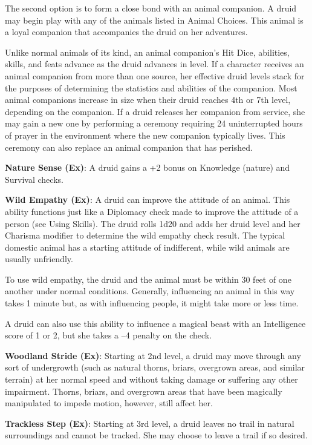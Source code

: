 The second option is to form a close bond with an animal companion. A druid may begin play with any of the animals listed in Animal Choices. This animal is a loyal companion that accompanies the druid on her adventures.
				
Unlike normal animals of its kind, an animal companion's Hit Dice, abilities, skills, and feats advance as the druid advances in level. If a character receives an animal companion from more than one source, her effective druid levels stack for the purposes of determining the statistics and abilities of the companion. Most animal companions increase in size when their druid reaches 4th or 7th level, depending on the companion. If a druid releases her companion from service, she may gain a new one by performing a ceremony requiring 24 uninterrupted hours of prayer in the environment where the new companion typically lives. This ceremony can also replace an animal companion that has perished.
				
\textbf{Nature Sense (Ex)}: A druid gains a +2 bonus on Knowledge (nature) and Survival checks.
				
\textbf{Wild Empathy (Ex)}: A druid can improve the attitude of an animal. This ability functions just like a Diplomacy check made to improve the attitude of a person (see Using Skills). The druid rolls 1d20 and adds her druid level and her Charisma modifier to determine the wild empathy check result. The typical domestic animal has a starting attitude of indifferent, while wild animals are usually unfriendly.
				
To use wild empathy, the druid and the animal must be within 30 feet of one another under normal conditions. Generally, influencing an animal in this way takes 1 minute but, as with influencing people, it might take more or less time.
				
A druid can also use this ability to influence a magical beast with an Intelligence score of 1 or 2, but she takes a --4 penalty on the check.
				
\textbf{Woodland Stride (Ex)}: Starting at 2nd level, a druid may move through any sort of undergrowth (such as natural thorns, briars, overgrown areas, and similar terrain) at her normal speed and without taking damage or suffering any other impairment. Thorns, briars, and overgrown areas that have been magically manipulated to impede motion, however, still affect her.
				
\textbf{Trackless Step (Ex)}: Starting at 3rd level, a druid leaves no trail in natural surroundings and cannot be tracked. She may choose to leave a trail if so desired.
				

